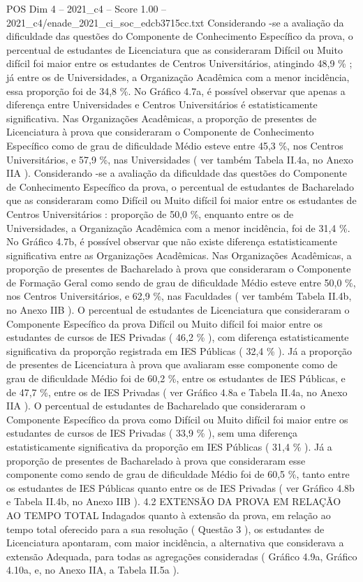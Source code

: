 \begin{textsample}{POS Dim 4 – 2021\_c4 – Score 1.00 – 2021\_c4/enade\_2021\_ci\_soc\_edcb3715cc.txt}
Considerando -se a avaliação da dificuldade das questões do Componente de Conhecimento Específico da prova, o percentual de estudantes de Licenciatura que as consideraram Difícil ou Muito difícil foi maior entre os estudantes de Centros Universitários, atingindo 48,9 \% ; já entre os de Universidades, a Organização Acadêmica com a menor incidência, essa proporção foi de 34,8 \%.
No Gráfico 4.7a, é possível observar que apenas a diferença entre Universidades e Centros Universitários é estatisticamente significativa.
Nas Organizações Acadêmicas, a proporção de presentes de Licenciatura à prova que consideraram o Componente de Conhecimento Específico como de grau de dificuldade Médio esteve entre 45,3 \%, nos Centros Universitários, e 57,9 \%, nas Universidades ( ver também Tabela II.4a, no Anexo IIA ).
Considerando -se a avaliação da dificuldade das questões do Componente de Conhecimento Específico da prova, o percentual de estudantes de Bacharelado que as consideraram como Difícil ou Muito difícil foi maior entre os estudantes de Centros Universitários : proporção de 50,0 \%, enquanto entre os de Universidades, a Organização Acadêmica com a menor incidência, foi de 31,4 \%.
No Gráfico 4.7b, é possível observar que não existe diferença estatisticamente significativa entre as Organizações Acadêmicas.
Nas Organizações Acadêmicas, a proporção de presentes de Bacharelado à prova que consideraram o Componente de Formação Geral como sendo de grau de dificuldade Médio esteve entre 50,0 \%, nos Centros Universitários, e 62,9 \%, nas Faculdades ( ver também Tabela II.4b, no Anexo IIB ).
O percentual de estudantes de Licenciatura que consideraram o Componente Específico da prova Difícil ou Muito difícil foi maior entre os estudantes de cursos de IES Privadas ( 46,2 \% ), com diferença estatisticamente significativa da proporção registrada em IES Públicas ( 32,4 \% ).
Já a proporção de presentes de Licenciatura à prova que avaliaram esse componente como de grau de dificuldade Médio foi de 60,2 \%, entre os estudantes de IES Públicas, e de 47,7 \%, entre os de IES Privadas ( ver Gráfico 4.8a e Tabela II.4a, no Anexo IIA ).
O percentual de estudantes de Bacharelado que consideraram o Componente Específico da prova como Difícil ou Muito difícil foi maior entre os estudantes de cursos de IES Privadas ( 33,9 \% ), sem uma diferença estatisticamente significativa da proporção em IES Públicas ( 31,4 \% ).
Já a proporção de presentes de Bacharelado à prova que consideraram esse componente como sendo de grau de dificuldade Médio foi de 60,5 \%, tanto entre os estudantes de IES Públicas quanto entre os de IES Privadas ( ver Gráfico 4.8b e Tabela II.4b, no Anexo IIB ). 4.2 EXTENSÃO DA PROVA EM RELAÇÃO AO TEMPO TOTAL Indagados quanto à extensão da prova, em relação ao tempo total oferecido para a sua resolução ( Questão 3 ), os estudantes de Licenciatura apontaram, com maior incidência, a alternativa que considerava a extensão Adequada, para todas as agregações consideradas ( Gráfico 4.9a, Gráfico 4.10a, e, no Anexo IIA, a Tabela II.5a ).

\end{textsample}
